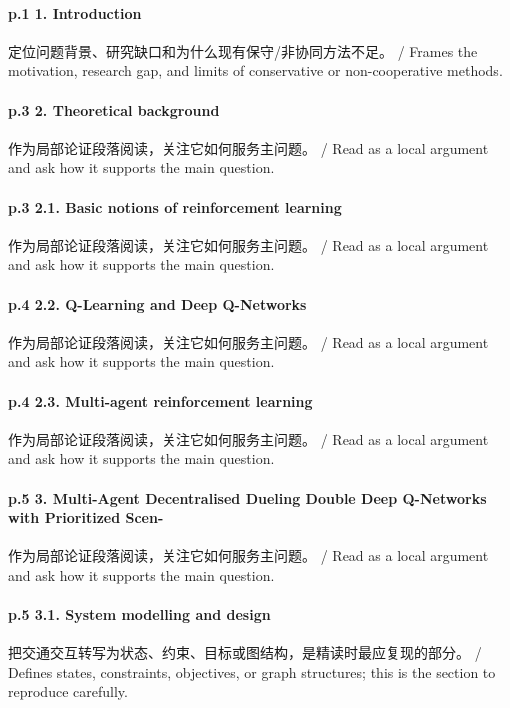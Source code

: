\documentclass[UTF8,a4paper,11pt,fontset=fandol]{ctexart}
\begin{document}
\paragraph{p.1 1. Introduction}定位问题背景、研究缺口和为什么现有保守/非协同方法不足。 / Frames the motivation, research gap, and limits of conservative or non-cooperative methods.

\paragraph{p.3 2. Theoretical background}作为局部论证段落阅读，关注它如何服务主问题。 / Read as a local argument and ask how it supports the main question.

\paragraph{p.3 2.1. Basic notions of reinforcement learning}作为局部论证段落阅读，关注它如何服务主问题。 / Read as a local argument and ask how it supports the main question.

\paragraph{p.4 2.2. Q-Learning and Deep Q-Networks}作为局部论证段落阅读，关注它如何服务主问题。 / Read as a local argument and ask how it supports the main question.

\paragraph{p.4 2.3. Multi-agent reinforcement learning}作为局部论证段落阅读，关注它如何服务主问题。 / Read as a local argument and ask how it supports the main question.

\paragraph{p.5 3. Multi-Agent Decentralised Dueling Double Deep Q-Networks with Prioritized Scen-}作为局部论证段落阅读，关注它如何服务主问题。 / Read as a local argument and ask how it supports the main question.

\paragraph{p.5 3.1. System modelling and design}把交通交互转写为状态、约束、目标或图结构，是精读时最应复现的部分。 / Defines states, constraints, objectives, or graph structures; this is the section to reproduce carefully.
\end{document}
